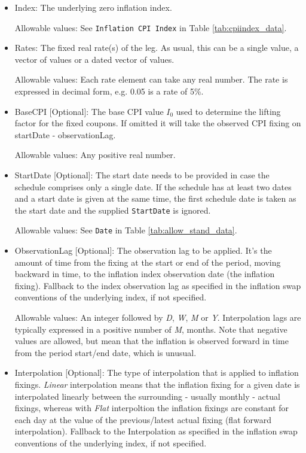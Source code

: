 \begin{itemize}
\item Index: The underlying zero inflation index.

Allowable values:  See \lstinline!Inflation CPI Index! in Table \ref{tab:cpiindex_data}.
\item Rates: The fixed real rate(s) of the leg. As usual, this can be a single value, a vector of values or a dated vector of
  values.
 
 Allowable values: Each rate element can take any  real number. The rate is
  expressed in decimal form, e.g. 0.05 is a rate of 5\%.
\item BaseCPI [Optional]: The base CPI value $I_0$ used to determine the lifting factor for the fixed coupons. If omitted it will take the observed CPI fixing on startDate - observationLag.

Allowable values:  Any positive real number.

\item StartDate [Optional]: The start date needs to be provided in case the schedule comprises only a single date. If
  the schedule has at least two dates and a start date is given at the same time, the first schedule date is taken as 
  the start date and the supplied \lstinline!StartDate! is ignored.
  
Allowable values:  See \lstinline!Date! in Table \ref{tab:allow_stand_data}. 

\item ObservationLag [Optional]: The observation lag to be applied. It's the amount of time from the fixing at the start or end of the period, moving backward in time, to the inflation index observation date (the inflation fixing). Fallback to the index observation lag as specified in the inflation swap conventions of the underlying index, if not specified. 

Allowable values: An integer followed by \emph{D}, \emph{W}, \emph{M} or \emph{Y}. Interpolation lags are typically expressed in a positive number of  \emph{M}, months. Note that negative values are allowed, but mean that the inflation is observed forward in time from the period start/end date, which is unusual.  

\item Interpolation [Optional]: The type of interpolation that is applied to inflation fixings. \emph{Linear} interpolation means that the inflation fixing for a given date is interpolated linearly between the surrounding - usually monthly - actual fixings, whereas with  \emph{Flat} interpoltion the inflation fixings are constant for each day at the value of the previous/latest actual fixing (flat forward interpolation).  
Fallback to the Interpolation as specified in the inflation swap conventions of the underlying index, if not specified. 


\end{itemize}
